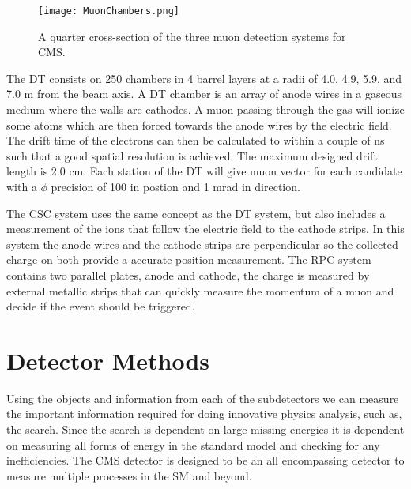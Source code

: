 \begin{figure}
 	\centering
	\texttt{[image: MuonChambers.png]}
 	\caption[Muon Chambers]{A quarter cross-section of the three muon detection systems for CMS. }
 	\label{MuonChambers} 
\end{figure}

The DT consists on 250 chambers in 4 barrel layers at a radii of 4.0, 4.9, 5.9, and 7.0 m from the beam axis. A DT chamber is an array of anode wires in a gaseous medium where the walls are cathodes. A muon passing through the gas will ionize some atoms which are then forced towards the anode wires by the electric field. The drift time of the electrons can then be calculated to within a couple of ns such that a good spatial resolution is achieved. The maximum designed drift length is 2.0 cm. Each station of the DT will give muon vector for each candidate with a $\phi$ precision of 100 \mum{} in postion and 1 mrad in direction. 

The CSC system uses the same concept as the DT system, but also includes a measurement of the ions that follow the electric field to the cathode strips. In this system the anode wires and the cathode strips are perpendicular so the collected charge on both provide a accurate position measurement. The RPC system contains two parallel plates, anode and cathode, the charge is measured by external metallic strips that can quickly measure the momentum of a muon and decide if the event should be triggered.

\section{Detector Methods}
\label{sec:DetMethods}

Using the objects and information from each of the subdetectors we can measure the important information required for doing innovative physics analysis, such as, the \st{} search. Since the search is dependent on large missing energies it is dependent on measuring all forms of energy in the standard model and checking for any inefficiencies. The CMS detector is designed to be an all encompassing detector to measure multiple processes in the SM and beyond. 